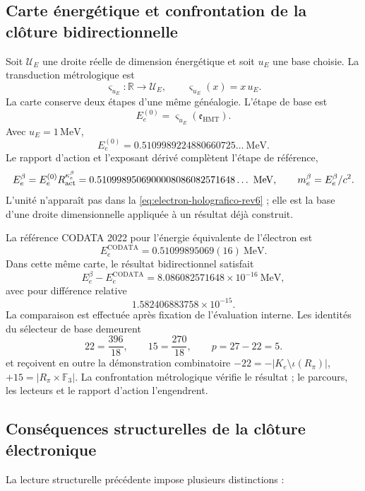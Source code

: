 \subsection{Carte énergétique et confrontation de la clôture bidirectionnelle}

Soit \(\mathcal U_E\) une droite réelle de dimension énergétique et soit
\(u_E\) une base choisie. La transduction métrologique est
\[
 \varsigma_{u_E}:\mathbb R\longrightarrow\mathcal U_E,
 \qquad
 \varsigma_{u_E}(x)=x\,u_E.
\]
La carte conserve deux étapes d'une même généalogie. L'étape de base est
\[
 E_e^{(0)}
 =
 \varsigma_{u_E}(\mathfrak e_{\mathrm{HMT}}).
\]
Avec \(u_E=1\,\mathrm{MeV}\),
\[
 E_e^{(0)}
 =
 0.5109989224880660725\ldots\ \mathrm{MeV}.
\]
Le rapport d'action et l'exposant dérivé complètent l'étape de référence,
\[
 E_e^\beta=E_e^{(0)}R_{\rm act}^{\kappa_e^\beta}
 =0.5109989506900008086082571648\ldots\ \mathrm{MeV},
 \qquad
 m_e^\beta=E_e^\beta/c^2.
\]
L'unité n'apparaît pas dans la
\cref{eq:electron-holografico-rev6} ; elle est la base d'une droite dimensionnelle
appliquée à un résultat déjà construit.

La référence CODATA 2022 pour l'énergie équivalente de l'électron est
\cite{CODATA2022}
\[
 E_e^{\mathrm{CODATA}}
 =
 0.51099895069(16)\ \mathrm{MeV}.
\]
Dans cette même carte, le résultat bidirectionnel satisfait
\[
 E_e^\beta-E_e^{\mathrm{CODATA}}
 =
 8.086082571648\times10^{-16}\ \mathrm{MeV},
\]
avec pour différence relative
\[
 1.582406883758\times10^{-15}.
\]
La comparaison est effectuée après fixation de l'évaluation interne. Les
identités du sélecteur de base demeurent
\[
 22=\frac{396}{18},
 \qquad
 15=\frac{270}{18},
 \qquad
 p=27-22=5.
\]
et reçoivent en outre la démonstration combinatoire
\(-22=-|K_e\setminus\iota(R_\pi)|\),
\(+15=|R_\pi\times\mathbb F_3|\). La confrontation métrologique vérifie le
résultat ; le parcours, les lecteurs et le rapport d'action l'engendrent.

\subsection{Conséquences structurelles de la clôture électronique}

La lecture structurelle précédente impose plusieurs distinctions :

